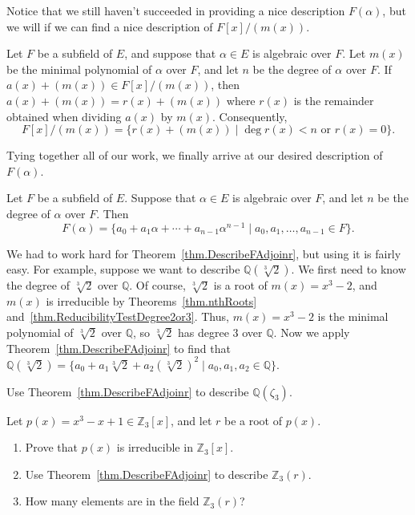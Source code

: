 Notice that we still haven't succeeded in providing a nice description $F(\alpha)$, but we will if we can find a nice description of $F[x]/(m(x))$.

\begin{lemma}\label{lem.DescribeQuotientWithRemainders}
Let $F$ be a subfield of $E$, and suppose that $\alpha\in E$ is algebraic over $F$. Let $m(x)$ be the minimal polynomial of $\alpha$ over $F$, and let $n$ be the degree of $\alpha$ over $F$.  If $a(x) + (m(x)) \in F[x]/(m(x))$, then $a(x) + (m(x)) =  r(x) + (m(x))$ where $r(x)$ is the remainder obtained when dividing $a(x)$ by $m(x)$. Consequently,
\[F[x]/(m(x)) = \{r(x) +  (m(x)) \mid \deg r(x) < n \text{ or } r(x) = 0\}.\]
\end{lemma}

Tying together all of our work, we finally arrive at our desired description of $F(\alpha)$.

\begin{theorem}\label{thm.DescribeFAdjoinr}
Let $F$ be a subfield of $E$. Suppose that $\alpha\in E$ is algebraic over $F$, and let $n$ be the degree of $\alpha$ over $F$. Then \[F(\alpha) = \{a_0 + a_1\alpha+\cdots+a_{n-1}\alpha^{n-1} \mid a_0,a_1,\ldots,a_{n-1} \in F\}.\]
\end{theorem}

We had to work hard for Theorem~\ref{thm.DescribeFAdjoinr}, but using it is fairly easy. For example, suppose we want to describe $\mathbb{Q}(\sqrt[3]{2})$. We first need to know the degree of $\sqrt[3]{2}$ over $\mathbb{Q}$. Of course, $\sqrt[3]{2}$ is a root of $m(x) = x^3-2$, and $m(x)$ is irreducible by Theorems~\ref{thm.nthRoots} and~\ref{thm.ReducibilityTestDegree2or3}. Thus, $m(x) = x^3-2$ is the minimal polynomial of $\sqrt[3]{2}$ over $\mathbb{Q}$, so $\sqrt[3]{2}$ has degree $3$ over $\mathbb{Q}$. Now we  apply Theorem~\ref{thm.DescribeFAdjoinr} to find that $\mathbb{Q}(\sqrt[3]{2}) = \{a_0 + a_1\sqrt[3]{2}+a_{2}(\sqrt[3]{2})^{2} \mid a_0,a_1,a_2 \in \mathbb{Q}\}$.

\begin{problem}
Use  Theorem~\ref{thm.DescribeFAdjoinr} to describe $\mathbb{Q}(\zeta_3)$.
\end{problem}

\begin{problem}\label{prob.Degree3ExtOfF3}
Let $p(x) = x^3-x+1 \in \mathbb{Z}_3[x]$, and let $r$ be a root of $p(x)$. 
\begin{enumerate}
\item Prove that $p(x)$ is irreducible in $\mathbb{Z}_3[x]$. 
\item Use Theorem~\ref{thm.DescribeFAdjoinr} to describe $\mathbb{Z}_3(r)$.
\item How many elements are in the field $\mathbb{Z}_3(r)$?
\end{enumerate}
\end{problem}

